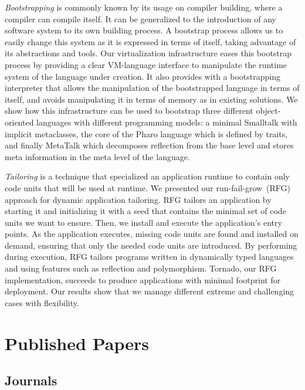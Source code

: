 \emph{Bootstrapping} is commonly known by its usage on compiler building, where a compiler can compile itself.
It can be generalized to the introduction of any software system to its own building process.
A bootstrap process allows us to easily change this system as it is expressed in terms of itself, taking advantage of its abstractions and tools.
Our virtualization infrastructure eases this bootstrap process by providing a clear VM-language interface to manipulate the runtime system of the language under creation. It also provides with a bootstrapping interpreter that allows the manipulation of the bootstrapped language in terms of itself, and avoids manipulating it in terms of memory as in existing solutions.
We show how this infrastructure can be used to bootstrap three different object-oriented languages with different programming models: a minimal Smalltalk with implicit metaclasses, the core of the Pharo language which is defined by traits, and finally MetaTalk which decomposes reflection from the base level and stores meta information in the meta level of the language.

\emph{Tailoring} is a technique that specialized an application runtime to contain only code units that will be used at runtime. We presented our run-fail-grow~(RFG) approach for dynamic application tailoring. RFG tailors an application by starting it and initializing it with a seed that contains the minimal set of code units we want to ensure. Then, we install and execute the application's entry points. As the application executes, missing code units are found and installed on demand, ensuring that only the needed code units are introduced. By performing during execution, RFG tailors programs written in dynamically typed languages and using features such as reflection and polymorphism. Tornado, our RFG implementation, succeeds to produce applications with minimal footprint for deployment. Our results show that we manage different extreme and challenging cases with flexibility.

\section{Published Papers}

\subsection{Journals}

